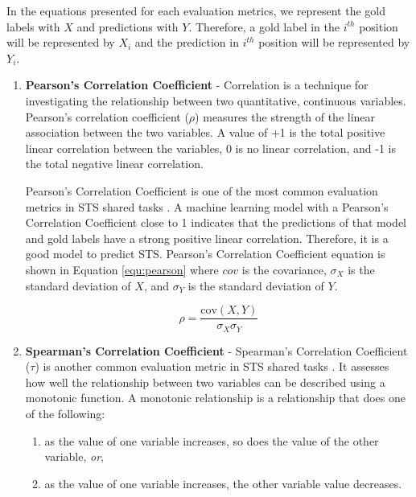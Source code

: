 In the equations presented for each evaluation metrics, we represent the gold labels with $X$ and predictions with $Y$. Therefore, a gold label in the $i^{th}$ position will be represented by $X_i$ and the prediction in $i^{th}$ position will be represented by $Y_i$. 

\begin{enumerate}
	
	\item \textbf{Pearson's Correlation Coefficient} - Correlation is a technique for investigating the relationship between two quantitative, continuous variables. Pearson's correlation coefficient ($\rho$) measures the strength of the linear association between the two variables. A value of +1 is the total positive linear correlation between the variables, 0 is no linear correlation, and -1 is the total negative linear correlation. 
	
	Pearson's Correlation Coefficient is one of the most common evaluation metrics in STS shared tasks \autocite{marelli-etal-2014-semeval,agirre-etal-2012-semeval,agirre-etal-2013-sem,agirre-etal-2014-semeval,agirre-etal-2015-semeval,agirre-etal-2016-semeval}. A machine learning model with a Pearson's Correlation Coefficient close to 1 indicates that the predictions of that model and gold labels have a strong positive linear correlation. Therefore, it is a good model to predict STS. Pearson's Correlation Coefficient equation is shown in Equation \ref{equ:pearson} where $cov$  is the covariance, $\sigma_X$ is the standard deviation of $X$, and $\sigma_Y$ is the standard deviation of $Y$.
	
	\begin{equation}
	\label{equ:pearson}
	\rho = \frac{\text{cov}(X,Y)}{\sigma_X \sigma_Y}
	\end{equation}
	
	\item \textbf{Spearman's Correlation Coefficient} - Spearman's Correlation Coefficient ($\tau$) is another common evaluation metric in STS shared tasks \autocite{marelli-etal-2014-semeval,agirre-etal-2012-semeval,agirre-etal-2013-sem,agirre-etal-2014-semeval,agirre-etal-2015-semeval,agirre-etal-2016-semeval}. It assesses how well the relationship between two variables can be described using a monotonic function. A monotonic relationship is a relationship that does one of the following: 
	
	\begin{enumerate}
		\item as the value of one variable increases, so does the value of the other variable, \textit{or},
		\item as the value of one variable increases, the other variable value decreases.
	\end{enumerate}
	

\end{enumerate}
